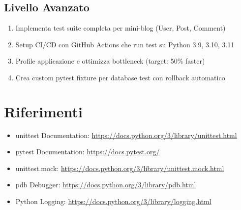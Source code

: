 \subsection{Livello Avanzato}
\begin{enumerate}
  \item Implementa test suite completa per mini-blog (User, Post, Comment)
  \item Setup CI/CD con GitHub Actions che run test su Python 3.9, 3.10, 3.11
  \item Profile applicazione e ottimizza bottleneck (target: 50\% faster)
  \item Crea custom pytest fixture per database test con rollback automatico
\end{enumerate}

\section{Riferimenti}
\begin{itemize}
  \item unittest Documentation: \url{https://docs.python.org/3/library/unittest.html}
  \item pytest Documentation: \url{https://docs.pytest.org/}
  \item unittest.mock: \url{https://docs.python.org/3/library/unittest.mock.html}
  \item pdb Debugger: \url{https://docs.python.org/3/library/pdb.html}
  \item Python Logging: \url{https://docs.python.org/3/library/logging.html}
\end{itemize}

